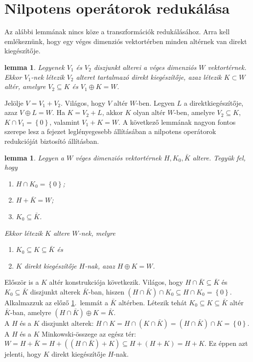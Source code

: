 \documentclass[a4paper, showtrims]{memoir}
\makeatletter
\renewenvironment{proof}[1][\proofname]
    {\par\pushQED{\qed}%
    \normalfont \topsep6\p@\@plus6\p@\relax
    \trivlist
    \item[\hskip\labelsep
        \itshape
    #1\@addpunct{:}]\ignorespaces}
    {\popQED\endtrivlist\@endpefalse}
\theoremstyle{plain}
\newtheorem{lemma}[proposition]{lemma}
\theoremstyle{remark}
\theoremstyle{definition}
\makeatother
\begin{document}
\section{Nilpotens operátorok redukálása}
Az alábbi lemmának nincs köze a transzformációk redukálásához.
Arra kell emlékeznünk, hogy egy véges dimenziós vektortérben minden altérnek van direkt kiegészítője.
\begin{lemma}
	Legyenek $V_1$ és $V_2$ diszjunkt alterei a véges dimenziós $W$ vektortérnek.
	Ekkor $V_1$-nek létezik $V_2$ alteret tartalmazó direkt kiegészítője,
	azaz
	létezik $K\subset W$ altér, amelyre $V_2\subseteq K$ és $V_1\oplus K=W.$
	\label{felb0}
\end{lemma}
\begin{proof}
	Jelölje $V=V_1+V_2$.
	Világos, hogy $V$ altér $W$-ben.
	Legyen $L$ a direktkiegészítője, azaz $V\oplus L=W$.
	Ha $K=V_2+L$, akkor $K$ olyan altér $W$-ben,
	amelyre $V_2\subseteq K$, $K\cap V_1=\left\{ 0 \right\}$, valamint
	$V_1+K=W$.
\end{proof}
A következő lemmának nagyon fontos szerepe lesz a fejezet leglényegesebb állításában
a nilpotens operátorok redukcióját biztosító állításban.
\begin{lemma}\label{lem:felb}
	Legyen a $W$ véges dimenziós vektortérnek $H,K_0,\bar{K}$ altere.
	Tegyük fel, hogy
	\begin{enumerate}\firmlist
		\item $H\cap K_0=\left\{ 0 \right\}$;
		\item $H+\bar{K}=W$;
		\item $K_0\subseteq\bar{K}$.
	\end{enumerate}
	Ekkor létezik $K$ altere $W$-nek, melyre
	\begin{enumerate}\firmlist
		\item $K_0\subseteq K\subseteq\bar{K}$ és
		\item $K$ direkt kiegészítője $H$-nak, azaz
		      $H\oplus K=W$.\qedhere
	\end{enumerate}
\end{lemma}
\begin{proof}
	Először is a $K$ altér konstrukciója következik.
	Világos, hogy $H\cap\bar{K}\subseteq\bar{K}$ és $K_0\subseteq\bar{K}$ diszjunkt alterek
	$\bar{K}$-ban, hiszen
	\(
	\left( H\cap\bar{K} \right)\cap K_0\subseteq
	H\cap K_0=\left\{ 0 \right\}.
	\)
	Alkalmazzuk az előző \ref{felb0}.~lemmát a $\bar{K}$ altérben.
	Létezik tehát $K_0\subseteq K\subseteq \bar{K}$ altér $\bar{K}$-ban,
	amelyre
	\(
	\left( H\cap\bar{K} \right)\oplus K=\bar{K}.
	\)
	\\
	A $H$ és a $K$ diszjunkt alterek:
	\(
	H\cap K=H\cap\left( K\cap \bar{K} \right)=\left( H\cap\bar{K} \right)\cap K=\left\{ 0 \right\}.
	\)
	\\
	A $H$ és a $K$ Minkowski-összege az egész tér:
	\(
	W=H+\bar{K}
	=
	H+\left( (H\cap\bar{K})+K \right)
	\subseteq
	H+(H+K)
	=
	H+K.
	\)
	Ez éppen azt jelenti, hogy $K$ direkt kiegészítője $H$-nak.
\end{proof}
\end{document}
